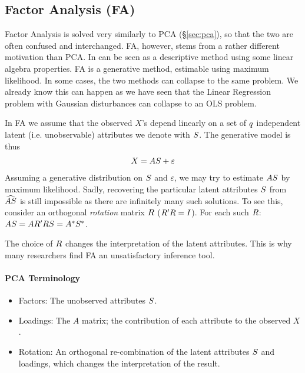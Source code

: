 \subsection{Factor Analysis (FA)}
\label{sec:factor_analysis}

Factor Analysis is solved very similarly to PCA (\S\ref{sec:pca}), so that the two are often confused and interchanged. 
FA, however, stems from a rather different motivation than PCA.
In can be seen as a descriptive method using some linear algebra properties.
FA is a generative method, estimable using maximum likelihood. In some cases, the two methods can collapse to the same problem. 
We already know this can happen as we have seen that the Linear Regression problem with Gaussian disturbances can collapse to an OLS problem. 

In FA we assume that the observed $X$'s depend linearly on a set of $q$ independent latent (i.e. unobservable) attributes we denote with $S$.
The generative model is thus
\begin{align}
\label{eq:factor}
	X=A S+\varepsilon
\end{align}
Assuming a generative distribution on $S$ and $\varepsilon$, we may try to estimate $A S$ by maximum likelihood.
Sadly, recovering the particular latent attributes $S$ from $\widehat{AS}$ is still impossible as there are infinitely many such solutions. To see this, consider an orthogonal \emph{rotation} matrix $R$ ($R' R=I$). For each such $R$: $ A S=A R' R S = A^* S^*$.

The choice of $R$ changes the interpretation of the latent attributes. This is why many researchers find FA an unsatisfactory inference tool.



\paragraph{PCA Terminology}
\begin{itemize}
\item Factors: The unobserved attributes $S$.
\item Loadings: The $A$ matrix; the contribution of each attribute to the observed $X$.
\item Rotation: An orthogonal re-combination of the latent attributes $S$ and loadings, which changes the interpretation of the result.
\end{itemize}




